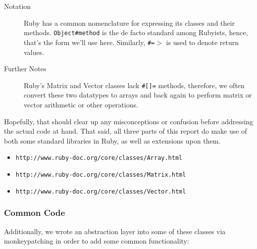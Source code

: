 \documentclass[letterpaper,12pt]{article}
\begin{document}
\begin{description}
\item[Notation]

  Ruby has a common nomenclature for expressing its classes and their methods.
  \texttt{Object\#method} is the de facto standard among Rubyists, hence, that's the form
  we'll use here.
  Similarly, \texttt{\#=$>$} is used to denote return values.

\item[Further Notes]

  Ruby's Matrix and Vector classes lack \texttt{\#[]=} methods, therefore, we often convert
  these two datatypes to arrays and back again to perform matrix or vector arithmetic
  or other operations.

\end{description}

Hopefully, that should clear up any misconceptions or confusion before
addressing the actual code at hand.
That said, all three parts of this report do make use of both some standard
libraries in Ruby, as well as extensions upon them.

\begin{itemize}

\item \texttt{http://www.ruby-doc.org/core/classes/Array.html}
\item \texttt{http://www.ruby-doc.org/core/classes/Matrix.html}
\item \texttt{http://www.ruby-doc.org/core/classes/Vector.html}

\end{itemize}

\subsubsection{Common Code}

Additionally, we wrote an abstraction layer into some of these classes via
monkeypatching in order to add some common functionality:
\end{document}
